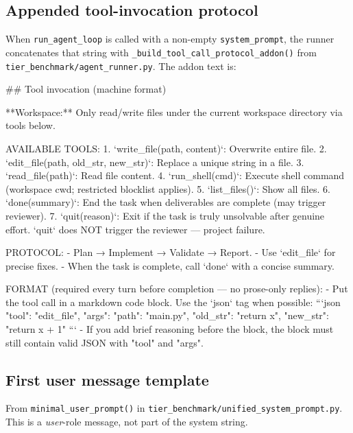 \begin{AgentDetails}
  \subsection{Appended tool-invocation protocol}
  \label{app:tool_invocation_protocol}
  
  When \texttt{run\_agent\_loop} is called with a non-empty \texttt{system\_prompt}, the runner concatenates that string with \texttt{\_build\_tool\_call\_protocol\_addon()} from \texttt{tier\_benchmark/agent\_runner.py}. The addon text is:
  
  \begin{PromptBlock}
  
  ## Tool invocation (machine format)
  
  **Workspace:** Only read/write files under the current workspace directory via tools below.
  
  AVAILABLE TOOLS:
  1. `write_file(path, content)`: Overwrite entire file.
  2. `edit_file(path, old_str, new_str)`: Replace a unique string in a file.
  3. `read_file(path)`: Read file content.
  4. `run_shell(cmd)`: Execute shell command (workspace cwd; restricted blocklist applies).
  5. `list_files()`: Show all files.
  6. `done(summary)`: End the task when deliverables are complete (may trigger reviewer).
  7. `quit(reason)`: Exit if the task is truly unsolvable after genuine effort. `quit` does NOT trigger the reviewer — project failure.
  
  PROTOCOL:
  - Plan → Implement → Validate → Report.
  - Use `edit_file` for precise fixes.
  - When the task is complete, call `done` with a concise summary.
  
  FORMAT (required every turn before completion — no prose-only replies):
  - Put the tool call in a markdown code block. Use the `json` tag when possible:
  ```json
  {
    "tool": "edit_file",
    "args": {
      "path": "main.py",
      "old_str": "return x",
      "new_str": "return x + 1"
    }
  }
  ```
  - If you add brief reasoning before the block, the block must still contain valid JSON with "tool" and "args".
  \end{PromptBlock}
  
  \subsection{First user message template}
  \label{app:first_user_message_templates}
  
  From \texttt{minimal\_user\_prompt()} in \texttt{tier\_benchmark/unified\_system\_prompt.py}. This is a \emph{user}-role message, not part of the system string.
  

\end{AgentDetails}

